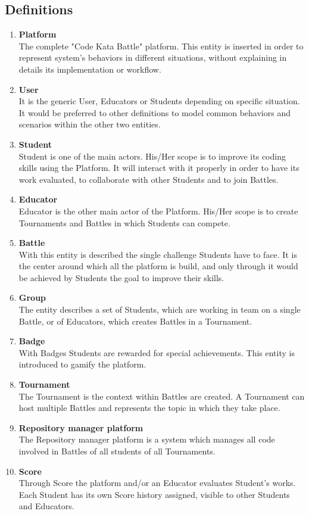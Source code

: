 \subsection{Definitions}
\begin{enumerate}[label=$\bullet$]
    \item \textbf{Platform}\\The complete "Code Kata Battle" platform. This entity is inserted in order to represent system's behaviors in different situations, without explaining in details its implementation or workflow.
    \item \textbf{User}\\It is the generic User, Educators or Students depending on specific situation. It would be preferred to other definitions to model common behaviors and scenarios within the other two entities.
    \item \textbf{Student}\\Student is one of the main actors. His/Her scope is to improve its coding skills using the Platform. It will interact with it properly in order to have its work evaluated, to collaborate with other Students and to join Battles.
    \item \textbf{Educator}\\Educator is the other main actor of the Platform. His/Her scope is to create Tournaments and Battles in which Students can compete.
    \item \textbf{Battle}\\With this entity is described the single challenge Students have to face. It is the center around which all the platform is build, and only through it would be achieved by Students the goal to improve their skills.
    \item \textbf{Group}\\The entity describes a set of Students, which are working in team on a single Battle, or of Educators, which creates Battles in a Tournament.
    \item \textbf{Badge}\\With Badges Students are rewarded for special achievements. This entity is introduced to gamify the platform.
    \item \textbf{Tournament}\\The Tournament is the context within Battles are created. A Tournament can host multiple Battles and represents the topic in which they take place.
    \item \textbf{Repository manager platform}\\The Repository manager platform is a system which manages all code involved in Battles of all students of all Tournaments.
    \item \textbf{Score}\\Through Score the platform and/or an Educator evaluates Student's works. Each Student has its own Score history assigned, visible to other Students and Educators.
\end{enumerate}
